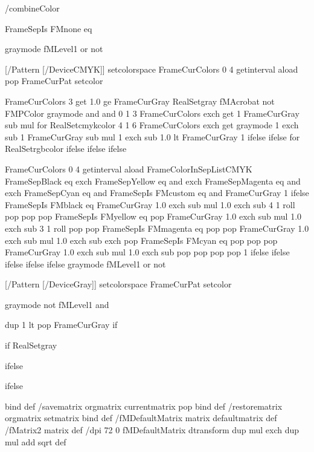 /combineColor {
    FrameSepIs FMnone eq
	{
		graymode fMLevel1 or not {
			
			[/Pattern [/DeviceCMYK]] setcolorspace
			FrameCurColors 0 4 getinterval aload pop FrameCurPat setcolor
		} {
			FrameCurColors 3 get 1.0 ge {
				FrameCurGray RealSetgray
			} {
				fMAcrobat not FMPColor graymode and and {
					0 1 3 { 
						FrameCurColors exch get
						1 FrameCurGray sub mul
					} for
					RealSetcmykcolor
				} {
					4 1 6 {
						FrameCurColors exch get
						graymode {
							1 exch sub 1 FrameCurGray sub mul 1 exch sub
						} {
							1.0 lt {FrameCurGray} {1} ifelse
						} ifelse
					} for
					RealSetrgbcolor
				} ifelse
			} ifelse
		} ifelse
	} { 
		FrameCurColors 0 4 getinterval aload
		FrameColorInSepListCMYK {
			FrameSepBlack eq exch 
			FrameSepYellow eq and exch 
			FrameSepMagenta eq and exch 
			FrameSepCyan eq and
			FrameSepIs FMcustom eq and
			{ FrameCurGray } { 1 } ifelse
		} {
			FrameSepIs FMblack eq
			{FrameCurGray 1.0 exch sub mul 1.0 exch sub 4 1 roll pop pop pop} {
			FrameSepIs FMyellow eq
			{pop FrameCurGray 1.0 exch sub mul 1.0 exch sub 3 1 roll pop pop} {
			FrameSepIs FMmagenta eq
			{pop pop FrameCurGray 1.0 exch sub mul 1.0 exch sub exch pop } {
			FrameSepIs FMcyan eq
			{pop pop pop FrameCurGray 1.0 exch sub mul 1.0 exch sub } 
			{pop pop pop pop 1} ifelse } ifelse } ifelse } ifelse 
		} ifelse
		graymode fMLevel1 or not {
			
			[/Pattern [/DeviceGray]] setcolorspace
			FrameCurPat setcolor
		} { 
			graymode not fMLevel1 and {
				
				dup 1 lt {pop FrameCurGray} if
			} if
			RealSetgray
		} ifelse
	} ifelse
} bind def
/savematrix {
	orgmatrix currentmatrix pop
	} bind def
/restorematrix {
	orgmatrix setmatrix
	} bind def
/fMDefaultMatrix matrix defaultmatrix def
/fMatrix2 matrix def
/dpi    72 0 fMDefaultMatrix dtransform
    dup mul exch   dup mul add   sqrt def
	
